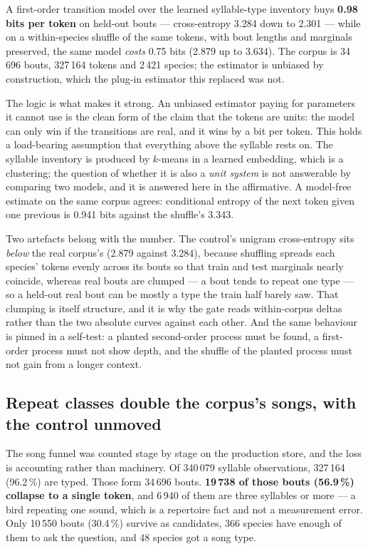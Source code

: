 \documentclass[10pt,twocolumn,a4paper]{article}
\begin{document}
A first-order transition model over the learned syllable-type inventory buys \textbf{0.98
bits per token} on held-out bouts --- cross-entropy 3.284 down to 2.301 --- while on a
within-species shuffle of the same tokens, with bout lengths and marginals preserved, the
same model \emph{costs} 0.75 bits (2.879 up to 3.634). The corpus is 34\,696 bouts, 327\,164
tokens and 2\,421 species; the estimator is unbiased by construction, which the plug-in
estimator this replaced was not.

The logic is what makes it strong. An unbiased estimator paying for parameters it cannot use
is the clean form of the claim that the tokens are units: the model can only win if the
transitions are real, and it wins by a bit per token. This holds a load-bearing assumption
that everything above the syllable rests on. The syllable inventory is produced by $k$-means
in a learned embedding, which is a clustering; the question of whether it is also a
\emph{unit system} is not answerable by comparing two models, and it is answered here in the
affirmative. A model-free estimate on the same corpus agrees: conditional entropy of the next
token given one previous is 0.941 bits against the shuffle's 3.343.

Two artefacts belong with the number. The control's unigram cross-entropy sits \emph{below}
the real corpus's (2.879 against 3.284), because shuffling spreads each species' tokens
evenly across its bouts so that train and test marginals nearly coincide, whereas real bouts
are clumped --- a bout tends to repeat one type --- so a held-out real bout can be mostly a
type the train half barely saw. That clumping is itself structure, and it is why the gate
reads within-corpus deltas rather than the two absolute curves against each other. And the
same behaviour is pinned in a self-test: a planted second-order process must be found, a
first-order process must not show depth, and the shuffle of the planted process must not gain
from a longer context.

\subsection{Repeat classes double the corpus's songs, with the control unmoved}

The song funnel was counted stage by stage on the production store, and the loss is
accounting rather than machinery. Of 340\,079 syllable observations, 327\,164 (96.2\,\%) are
typed. Those form 34\,696 bouts. \textbf{19\,738 of those bouts (56.9\,\%) collapse to a
single token}, and 6\,940 of them are three syllables or more --- a bird repeating one sound,
which is a repertoire fact and not a measurement error. Only 10\,550 bouts (30.4\,\%) survive
as candidates, 366 species have enough of them to ask the question, and 48 species got a song
type.
\end{document}
